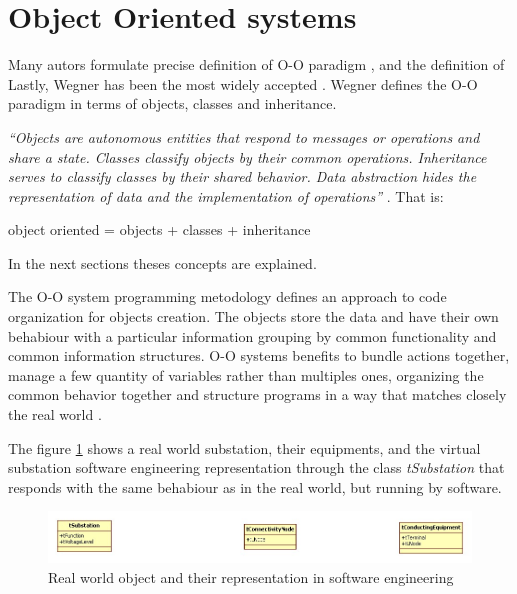 \section{Object Oriented systems}



Many autors formulate precise 
definition of O-O paradigm 
\cite{Rentsch:1982} 
\cite{Pascoe:1986}
\cite{Nygaard:1986}
\cite{Madsen:1988}, 
and the definition of Lastly, Wegner 
\cite{Wegner:1987} has been 
the most widely 
accepted \cite{Capretz:2003}. Wegner defines 
the O-O paradigm in terms of objects, 
classes and inheritance.

\emph{
	``Objects are autonomous entities 
	that respond to messages or operations and share 
	a state. Classes classify objects by their common 
	operations. Inheritance serves to classify classes by 
	their shared behavior. Data abstraction hides the 
	representation of data and the implementation of 
	operations'' 
}\cite{Wegner:1987}. That is: 

object oriented = objects + classes + inheritance

In the next sections theses concepts are explained.

The O-O system programming metodology 
defines an approach to code organization 
for objects creation. 
The objects store the data and 
have their own behabiour with a 
particular information grouping 
by common functionality and common 
information structures. 
O-O systems benefits 
to bundle actions together, 
manage a few quantity of variables rather 
than multiples ones, 
organizing the 
common behavior together and 
structure programs in a way that
matches closely 
the real world \cite{Adobe:AS3man2008}. 

The figure \ref{fig:real-world-objets-represented} shows  
a real world substation, their equipments, 
and the virtual substation  
software engineering representation 
through the class \emph{tSubstation} that 
responds with the same behabiour as in 
the real world, 
but running by software.


\begin{figure}


  \includegraphics[width=1.0\textwidth]{chapters/ch-oop/figures/real-word-objets-represented}
  \caption{Real world object and their representation in software engineering}
  \label{fig:real-world-objets-represented}
\end{figure}

